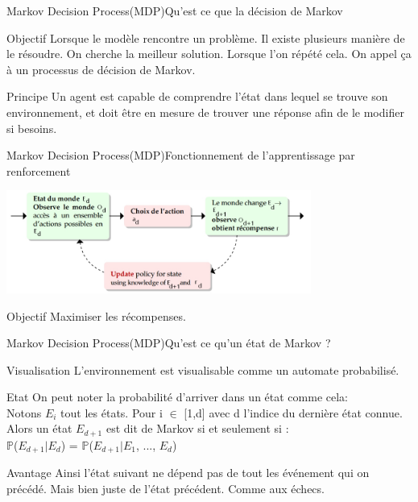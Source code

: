 
\begin{frame}{Markov Decision Process(MDP)}{Qu'est ce que la décision de Markov}
	\begin{center}
		
		\begin{block}{Objectif}
			Lorsque le modèle rencontre un problème. Il existe plusieurs manière de le résoudre. On cherche la meilleur solution. Lorsque l'on répété cela. On appel ça à un processus de décision de Markov. 
		\end{block}
		\begin{block}{Principe}
			Un agent est capable de comprendre l’état dans lequel se trouve son environnement, et doit être en mesure de trouver une réponse afin de le modifier si besoins.
		\end{block}
	\end{center}
\end{frame}
\begin{frame}{Markov Decision Process(MDP)}{Fonctionnement de l'apprentissage par renforcement}
	\begin{center}
		\includegraphics[width=10cm]{ressources/MDP/Fonctionnement.jpg}
	\end{center}
	\begin{block}{Objectif}
		Maximiser les récompenses.
	\end{block}
\end{frame}
\begin{frame}{Markov Decision Process(MDP)}{Qu'est ce qu'un état de Markov ?}
	\begin{center}
		
		\begin{block}{Visualisation}
			L'environnement est visualisable comme un automate probabilisé.
		\end{block}
		\begin{block}{Etat}
			On peut noter la probabilité d'arriver dans un état comme cela:\\
			Notons $E_{i}$ tout les états. Pour i $\in$ [1,d] avec d l'indice du dernière état connue.\\
			Alors un état $E_{d+1}$ est dit de Markov si et seulement si :\\ 
			$\mathbb{P}$($E_{d+1} | E_{d}$) = $\mathbb{P}$($E_{d+1} | E_{1}$, ..., $E_{d}$)\\
		\end{block}
		\begin{block}{Avantage}
			Ainsi l'état suivant ne dépend pas de tout les événement qui on précédé. Mais bien juste de l'état précédent. Comme aux échecs.
		\end{block}
	\end{center}
\end{frame}

